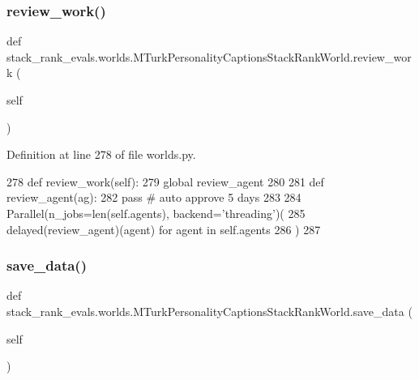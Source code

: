 \subsubsection{\texorpdfstring{review\+\_\+work()}{review\_work()}}
{\footnotesize\ttfamily def stack\+\_\+rank\+\_\+evals.\+worlds.\+M\+Turk\+Personality\+Captions\+Stack\+Rank\+World.\+review\+\_\+work (\begin{DoxyParamCaption}\item[{}]{self }\end{DoxyParamCaption})}



Definition at line 278 of file worlds.\+py.


\begin{DoxyCode}
278     \textcolor{keyword}{def }review\_work(self):
279         \textcolor{keyword}{global} review\_agent
280 
281         \textcolor{keyword}{def }review\_agent(ag):
282             \textcolor{keywordflow}{pass}  \textcolor{comment}{# auto approve 5 days}
283 
284         Parallel(n\_jobs=len(self.agents), backend=\textcolor{stringliteral}{'threading'})(
285             delayed(review\_agent)(agent) \textcolor{keywordflow}{for} agent \textcolor{keywordflow}{in} self.agents
286         )
287 
\end{DoxyCode}
\mbox{\label{classstack__rank__evals_1_1worlds_1_1MTurkPersonalityCaptionsStackRankWorld_a2ee07e4a6c5485756dcec60afe91a430}} 
\subsubsection{\texorpdfstring{save\+\_\+data()}{save\_data()}}
{\footnotesize\ttfamily def stack\+\_\+rank\+\_\+evals.\+worlds.\+M\+Turk\+Personality\+Captions\+Stack\+Rank\+World.\+save\+\_\+data (\begin{DoxyParamCaption}\item[{}]{self }\end{DoxyParamCaption})}



